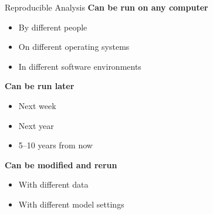 \documentclass[aspectratio=169]{beamer}
\begin{document}

\begin{frame}{Reproducible Analysis}\small
  \textbf{\darkgreen Can be run on any computer}\\[-0.6ex]
  \begin{itemize}
    \item[] By different people\\[-0.6ex]
    \item[] On different operating systems\\[-0.6ex]
    \item[] In different software environments\\[3ex]
  \end{itemize}
  \textbf{\darkgreen Can be run later}\\[-0.6ex]
  \begin{itemize}
    \item[] Next week\\[-0.6ex]
    \item[] Next year\\[-0.6ex]
    \item[] 5--10 years from now\\[3ex]
  \end{itemize}
  \textbf{\darkgreen Can be modified and rerun}\\[-0.6ex]
  \begin{itemize}
    \item[] With different data\\[-0.6ex]
    \item[] With different model settings
  \end{itemize}
\end{frame}

\end{document}

